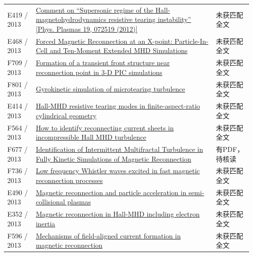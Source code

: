 \documentclass[UTF8,a4paper,11pt,openany,fontset=fandol]{ctexbook}
\begin{document}
\begin{longtable}{P{24mm}P{97mm}P{27mm}}
E419 / 2013 & \href{https://doi.org/10.1063/1.4789449}{Comment on “Supersonic regime of the Hall-magnetohydrodynamics resistive tearing instability” [Phys. Plasmas 19,  072519 (2012)]} & 未获匹配全文\\

E468 / 2013 & \href{http://ui.adsabs.harvard.edu/abs/2013AGUFMSH13A2039W/abstract}{Forced Magnetic Reconnection at an X-point: Particle-In-Cell and Ten-Moment Extended MHD Simulations} & 未获匹配全文\\

F709 / 2013 & \href{https://doi.org/10.1002/jgra.50136}{Formation of a transient front structure near reconnection point in 3‐D PIC simulations} & 未获匹配全文\\

F801 / 2013 & \href{https://doi.org/10.18725/oparu-2600}{Gyrokinetic simulation of microtearing turbulence} & 未获匹配全文\\

E414 / 2013 & \href{http://absimage.aps.org/image/DPP13/MWS_DPP13-2013-001107.pdf}{Hall-MHD resistive tearing modes in finite-aspect-ratio cylindrical geometry} & 未获匹配全文\\

F564 / 2013 & \href{https://doi.org/10.1002/jgra.50442}{How to identify reconnecting current sheets in incompressible Hall MHD turbulence} & 未获匹配全文\\

F677 / 2013 & \href{https://doi.org/10.1103/physrevlett.110.205002}{Identification of Intermittent Multifractal Turbulence in Fully Kinetic Simulations of Magnetic Reconnection} & 有PDF，待核读\\

F736 / 2013 & \href{https://doi.org/10.1007/s11467-013-0369-x}{Low frequency Whistler waves excited in fast magnetic reconnection processes} & 未获匹配全文\\

E490 / 2013 & \href{https://research.manchester.ac.uk/en/studentTheses/26c3b17d-87ca-4d98-b5b5-3a3d78e0dd03}{Magnetic reconnection and particle acceleration in semi-collisional plasmas} & 未获匹配全文\\

E352 / 2013 & \href{https://ui.adsabs.harvard.edu/abs/2013AGUFMSH51B2092G/abstract}{Magnetic reconnection in Hall-MHD including electron inertia} & 未获匹配全文\\

F596 / 2013 & \href{https://doi.org/10.1002/jgra.50457}{Mechanisms of field‐aligned current formation in magnetic reconnection} & 未获匹配全文\\


\end{longtable}
\end{document}
